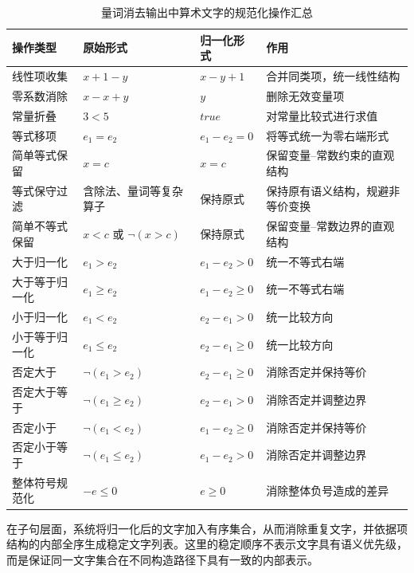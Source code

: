 \documentclass[11pt,a4paper]{article}
\begin{document}
\begin{table}[htbp]
  \centering
  \caption{量词消去输出中算术文字的规范化操作汇总}
  \label{tab:normalization-rules}
  \small
  \renewcommand{\arraystretch}{1.25}
  \begin{tabularx}{\textwidth}{
    >{\raggedright\arraybackslash}p{2.5cm}
    >{\raggedright\arraybackslash}p{3.0cm}
    >{\raggedright\arraybackslash}p{3.4cm}
    >{\raggedright\arraybackslash}X}
    \toprule
    操作类型 & 原始形式 & 归一化形式 & 作用 \\
    \midrule
    线性项收集 & $x+1-y$ & $x-y+1$ & 合并同类项，统一线性结构 \\
    零系数消除 & $x-x+y$ & $y$ & 删除无效变量项 \\
    常量折叠 & $3<5$ & $\mathit{true}$ & 对常量比较式进行求值 \\
    等式移项 & $e_1=e_2$ & $e_1-e_2=0$ & 将等式统一为零右端形式 \\
    简单等式保留 & $x=c$ & $x=c$ & 保留变量--常数约束的直观结构 \\
    等式保守过滤 & 含除法、量词等复杂算子 & 保持原式 & 保持原有语义结构，规避非等价变换 \\
    简单不等式保留 & $x<c$ 或 $\neg(x>c)$ & 保持原式 & 保留变量--常数边界的直观结构 \\
    大于归一化 & $e_1>e_2$ & $e_1-e_2>0$ & 统一不等式右端 \\
    大于等于归一化 & $e_1\geq e_2$ & $e_1-e_2\geq0$ & 统一不等式右端 \\
    小于归一化 & $e_1<e_2$ & $e_2-e_1>0$ & 统一比较方向 \\
    小于等于归一化 & $e_1\leq e_2$ & $e_2-e_1\geq0$ & 统一比较方向 \\
    否定大于 & $\neg(e_1>e_2)$ & $e_2-e_1\geq0$ & 消除否定并保持等价 \\
    否定大于等于 & $\neg(e_1\geq e_2)$ & $e_2-e_1>0$ & 消除否定并调整边界 \\
    否定小于 & $\neg(e_1<e_2)$ & $e_1-e_2\geq0$ & 消除否定并保持等价 \\
    否定小于等于 & $\neg(e_1\leq e_2)$ & $e_1-e_2>0$ & 消除否定并调整边界 \\
    整体符号规范化 & $-e\leq0$ & $e\geq0$ & 消除整体负号造成的差异 \\
    \bottomrule
  \end{tabularx}
\end{table}

在子句层面，系统将归一化后的文字加入有序集合，从而消除重复文字，并依据项结构的内部全序生成稳定文字列表。这里的稳定顺序不表示文字具有语义优先级，而是保证同一文字集合在不同构造路径下具有一致的内部表示。
\end{document}
